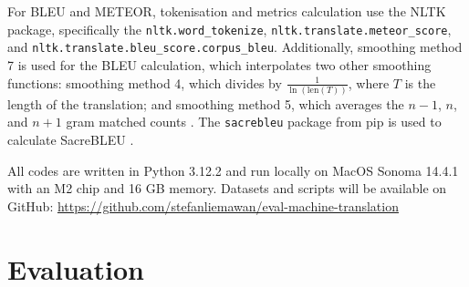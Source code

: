 \documentclass[a4paper, 11pt]{article}
\begin{document}
For BLEU and METEOR, tokenisation and metrics calculation use the NLTK \cite{bird-2009-natural} package, specifically the \texttt{nltk.word\_tokenize}, \texttt{nltk.translate.meteor\_score}, and \texttt{nltk.translate.bleu\_score.corpus\_bleu}. Additionally, smoothing method 7 is used for the BLEU calculation, which interpolates two other smoothing functions: smoothing method 4, which divides by \( \frac{1}{\ln(\text{len}(T))} \), where \( T \) is the length of the translation; and smoothing method 5, which averages the \( n-1 \), \( n \), and \( n+1 \) gram matched counts \cite{nltk-bleu-docs}. The \texttt{sacrebleu} \cite{post-2018-sacrebleu} package from pip is used to calculate SacreBLEU \cite{post-2018-sacrebleu}.

All codes are written in Python 3.12.2 and run locally on MacOS Sonoma 14.4.1 with an M2 chip and 16 GB memory. Datasets and scripts will be available on GitHub: \url{https://github.com/stefanliemawan/eval-machine-translation}

\section{Evaluation}
\end{document}
